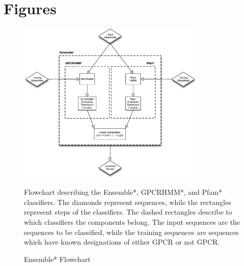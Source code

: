 \section{Figures}


\begin{figure}[H]
  \centering
  \caption{Ensemble* Flowchart}
  \includegraphics[width=0.8\textwidth]{figures/gpcr_classifier/ensemble-diagram.eps}
  
Flowchart describing the Ensemble*, GPCRHMM*, and Pfam* classifiers.  The diamonds represent sequences, while the rectangles represent steps of the classifiers.  The dashed rectangles describe to which classifiers the components belong. The input sequences are the sequences to be classified, while the training sequences are sequences which have known designations of either GPCR or not GPCR.
\label{fig:ensemble-diagram}
\end{figure}


